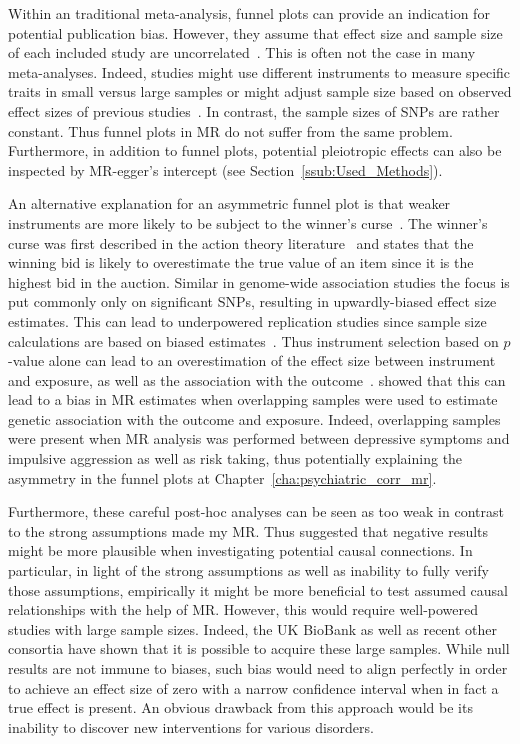 Within an traditional meta-analysis, funnel plots can provide an indication for potential publication bias.
However, they assume that effect size and sample size of each included study are uncorrelated~\cite{Evans2013}.
This is often not the case in many meta-analyses.
Indeed, studies might use different instruments to measure specific traits in small versus large samples or  might adjust sample size based on observed effect sizes of previous studies~\cite{Simonsohn}.
In contrast, the sample sizes of SNPs are rather constant.
Thus funnel plots in MR do not suffer from the same problem.
Furthermore, in addition to funnel plots, potential pleiotropic effects can also be inspected by MR-egger's intercept (see Section~\ref{ssub:Used_Methods}).

An alternative explanation for an asymmetric funnel plot is that weaker instruments are more likely to be subject to the winner's curse~\cite{Taylor2014}.
The winner's curse was first described in the action theory literature~\cite{Bazerman1983} and states that the winning bid is likely to overestimate the true value of an item since it is the highest bid in the auction.
Similar in genome-wide association studies the focus is put commonly only  on significant SNPs, resulting in upwardly-biased effect size estimates.
This can lead to underpowered replication studies since sample size calculations are based on biased estimates~\cite{Xiao2008}.
Thus instrument selection based on $p$-value alone can lead to an overestimation of the effect size between instrument and exposure, as well as  the association with the outcome~\cite{Bowden2015a}.
\citet{Taylor2014} showed that this can lead to a bias in MR estimates when overlapping samples were used to estimate genetic association with the outcome and exposure.
Indeed, overlapping samples were present when MR analysis was performed between depressive symptoms and impulsive aggression as well as risk taking,
thus potentially explaining the asymmetry in the funnel plots at Chapter~\ref{cha:psychiatric_corr_mr}.

Furthermore, these careful post-hoc analyses can be seen as too weak in contrast to the strong assumptions made my MR\@. 
Thus \citet{Vanderweele2015} suggested that negative results might be more plausible when investigating potential causal connections.
In particular, in light of the strong assumptions as well as inability to fully verify those assumptions, empirically it might be more beneficial to test assumed causal relationships with the help of MR\@.
However, this would require well-powered studies with large sample sizes.
Indeed, the UK BioBank as well as recent other consortia have shown that it is possible to acquire these large samples.
While null results are not immune to biases, such bias would need to align perfectly in order to achieve an effect size of zero with a narrow confidence interval when in fact a true effect is present.
An obvious drawback from this approach would be its inability to discover new interventions for various disorders. 

